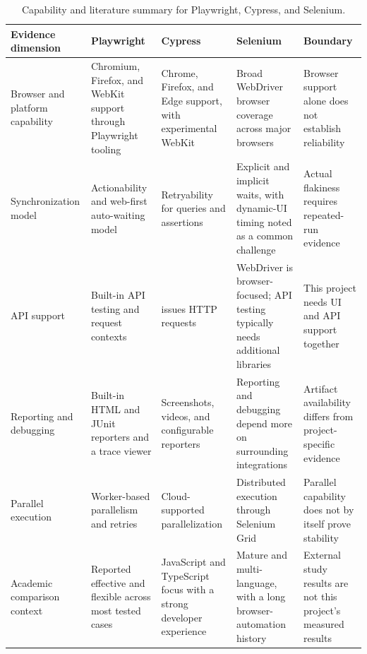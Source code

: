 \begin{table}[htbp]
  \centering
  \tablefont
  \setlength{\tabcolsep}{4pt}
  \begin{tabularx}{\textwidth}{>{\RaggedRight\arraybackslash}p{}YYY>{\RaggedRight\arraybackslash}p{0.14\textwidth}}
    \toprule
    Evidence dimension & Playwright & Cypress & Selenium & Boundary \\
    \midrule
    Browser and platform capability & Chromium, Firefox, and WebKit support through Playwright tooling \autocite{playwright_docs_intro_2026} & Chrome, Firefox, and Edge support, with experimental WebKit \autocite{cypress_browser_support_2026} & Broad WebDriver browser coverage across major browsers \autocite{selenium_docs_browsers_2026} & Browser support alone does not establish reliability \\
    Synchronization model & Actionability and web-first auto-waiting model \autocite{playwright_docs_actionability_2026} & Retryability for queries and assertions \autocite{cypress_docs_retryability_2026} & Explicit and implicit waits, with dynamic-UI timing noted as a common challenge \autocite{selenium_docs_waits_2026} & Actual flakiness requires repeated-run evidence \\
    API support & Built-in API testing and request contexts \autocite{playwright_docs_api_testing_2026} &  issues HTTP requests \autocite{cypress_docs_request_2026} & WebDriver is browser-focused; API testing typically needs additional libraries \autocite{selenium_webdriver_2026} & This project needs UI and API support together \\
    Reporting and debugging & Built-in HTML and JUnit reporters and a trace viewer \autocite{playwright_docs_reporters_2026,playwright_docs_trace_viewer_2026} & Screenshots, videos, and configurable reporters \autocite{cypress_docs_screenshots_videos_2026,cypress_docs_reporters_2026} & Reporting and debugging depend more on surrounding integrations \autocite{selenium_page_object_models_2026} & Artifact availability differs from project-specific evidence \\
    Parallel execution & Worker-based parallelism and retries \autocite{playwright_docs_parallelism_2026,playwright_docs_retries_2026} & Cloud-supported parallelization \autocite{cypress_docs_parallelization_2026} & Distributed execution through Selenium Grid \autocite{selenium_docs_grid_2026} & Parallel capability does not by itself prove stability \\
    Academic comparison context & Reported effective and flexible across most tested cases \autocite{mon_panczyk_tool_comparison_2025} & JavaScript and TypeScript focus with a strong developer experience & Mature and multi-language, with a long browser-automation history & External study results are not this project's measured results \\
    \bottomrule
  \end{tabularx}
  \caption{Capability and literature summary for Playwright, Cypress, and Selenium.}
  \label{tab:ch5-capability-literature-summary}
\end{table}

